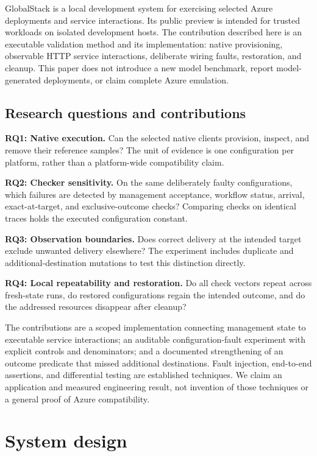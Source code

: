 \documentclass[10pt,a4paper]{article}
\begin{document}
GlobalStack is a local development system for exercising selected Azure deployments and service interactions. Its public preview is intended for trusted workloads on isolated development hosts. The contribution described here is an executable validation method and its implementation: native provisioning, observable HTTP service interactions, deliberate wiring faults, restoration, and cleanup. This paper does not introduce a new model benchmark, report model-generated deployments, or claim complete Azure emulation.

\subsection{Research questions and contributions}
\textbf{RQ1: Native execution.} Can the selected native clients provision, inspect, and remove their reference samples? The unit of evidence is one configuration per platform, rather than a platform-wide compatibility claim.

\textbf{RQ2: Checker sensitivity.} On the same deliberately faulty configurations, which failures are detected by management acceptance, workflow status, arrival, exact-at-target, and exclusive-outcome checks? Comparing checks on identical traces holds the executed configuration constant.

\textbf{RQ3: Observation boundaries.} Does correct delivery at the intended target exclude unwanted delivery elsewhere? The experiment includes duplicate and additional-destination mutations to test this distinction directly.

\textbf{RQ4: Local repeatability and restoration.} Do all check vectors repeat across fresh-state runs, do restored configurations regain the intended outcome, and do the addressed resources disappear after cleanup?

The contributions are a scoped implementation connecting management state to executable service interactions; an auditable configuration-fault experiment with explicit controls and denominators; and a documented strengthening of an outcome predicate that missed additional destinations. Fault injection, end-to-end assertions, and differential testing are established techniques. We claim an application and measured engineering result, not invention of those techniques or a general proof of Azure compatibility.

\section{System design}
\end{document}
